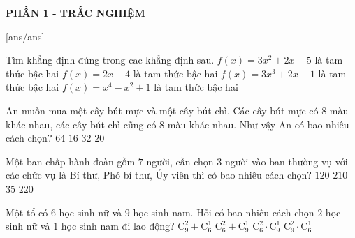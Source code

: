 
\begin{center}
	\textbf{PHẦN 1 - TRẮC NGHIỆM}
\end{center}
[ans/ans]
\begin{ex}%
	Tìm khẳng định đúng trong cac khẳng định sau.
	\choice
	{\True $f(x)=3 x^2+2 x-5$ là tam thức bậc hai}
	{ $f(x)=2 x-4$ là tam thức bậc hai}
	{$f(x)=3 x^3+2 x-1$ là tam thức bậc hai}
	{$f(x)=x^4-x^2+1$ là tam thức bậc hai}
\end{ex}
\begin{ex}%
	An muốn mua một cây bút mực và một cây bút chì. Các cây bút mực có $8$ màu khác nhau, các cây bút chì cũng có $8$ màu khác nhau. Như vậy An có bao nhiêu cách chọn?
	\choice
	{\True $64$}
	{$16$}
	{$32$}
	{$20$}
\end{ex}
\begin{ex}%
	Một ban chấp hành đoàn gồm $7$ người, cần chọn $3$ người vào ban thường vụ với các chức vụ là Bí thư, Phó bí thư, Ủy viên thì có bao nhiêu cách chọn?
	\choice
	{$120$}
	{\True $210$}
	{$35$}
	{$220$}
\end{ex}
\begin{ex}%
	Một tổ có $6$ học sinh nữ và $9$ học sinh nam. Hỏi có bao nhiêu cách chọn $2$ học sinh nữ và $1$ học sinh nam đi lao động?
	\choice
	{$\mathrm{C}_9^2+\mathrm{C}_6^1$}
	{$\mathrm{C}_6^2+\mathrm{C}_9^1$}
	{\True $\mathrm{C}_6^2 \cdot \mathrm{C}_9^1$}
	{$\mathrm{C}_9^2 \cdot \mathrm{C}_6^1$}
\end{ex}
